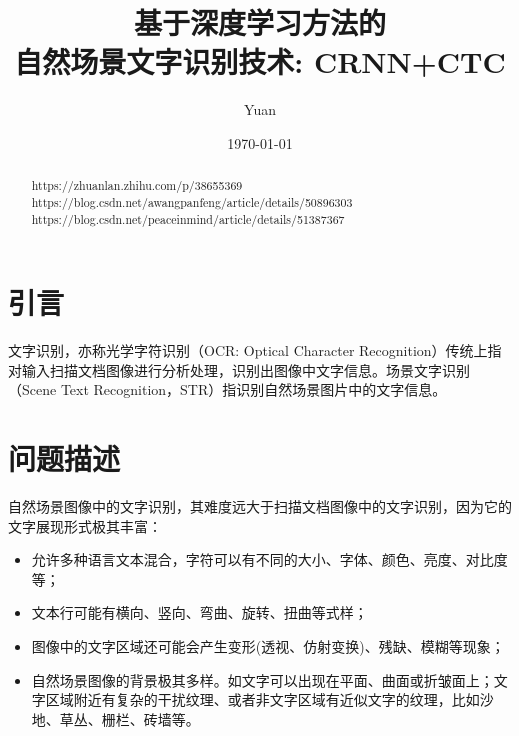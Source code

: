 \documentclass[12pt,a4paper]{ctexart}
\title{基于深度学习方法的\\
	自然场景文字识别技术: CRNN+CTC}
\author{Yuan}
\date{\small\today}
\begin{document}
\maketitle
\begin{abstract}
https://zhuanlan.zhihu.com/p/38655369
https://blog.csdn.net/awangpanfeng/article/details/50896303
https://blog.csdn.net/peaceinmind/article/details/51387367
\end{abstract}	
\section{引言}
文字识别，亦称光学字符识别（OCR: Optical Character Recognition）传统上指对输入扫描文档图像进行分析处理，识别出图像中文字信息。场景文字识别（Scene Text Recognition，STR）指识别自然场景图片中的文字信息。

\section{问题描述}
自然场景图像中的文字识别，其难度远大于扫描文档图像中的文字识别，因为它的文字展现形式极其丰富：

\begin{itemize}
	\item 允许多种语言文本混合，字符可以有不同的大小、字体、颜色、亮度、对比度等；
	\item 文本行可能有横向、竖向、弯曲、旋转、扭曲等式样；
	\item 图像中的文字区域还可能会产生变形(透视、仿射变换)、残缺、模糊等现象；
	\item 自然场景图像的背景极其多样。如文字可以出现在平面、曲面或折皱面上；文字区域附近有复杂的干扰纹理、或者非文字区域有近似文字的纹理，比如沙地、草丛、栅栏、砖墙等。
\end{itemize}
\end{document}
